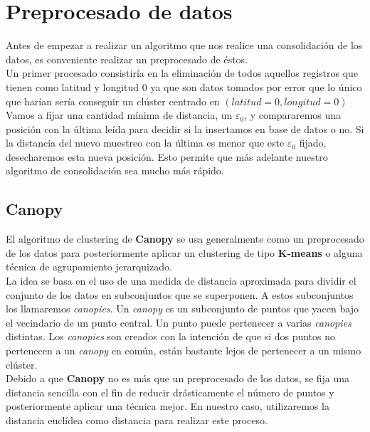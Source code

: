 \documentclass[a4paper, 12pt, spanish]{article}
\begin{document}
\pagebreak
\section{Preprocesado de datos}
Antes de empezar a realizar un algoritmo que nos realice una consolidaci\'on de los datos, es conveniente realizar un preprocesado de \'estos. \\

Un primer procesado consistir\'ia en la eliminaci\'on de todos aquellos registros que tienen como latitud y longitud $0$ ya que son datos tomados por error que lo \'unico que har\'ian ser\'ia conseguir un cl\'uster centrado en $(latitud = 0, longitud = 0)$ \\

Vamos a fijar una cantidad m\'inima de distancia, un $\varepsilon_0$, y compararemos una posici\'on con la \'ultima le\'ida para decidir si la insertamos en base de datos o no. Si la distancia del nuevo muestreo con la \'ultima es menor que este $\varepsilon_0$ fijado, desecharemos esta nueva posici\'on. Esto permite que m\'as adelante nuestro algoritmo de consolidaci\'on sea mucho m\'as r\'apido. \\


\subsection{Canopy}\label{sec:canopy}

El algoritmo de clustering de \textbf{Canopy}\cite{canopy} se usa generalmente como un preprocesado de los datos para posteriormente aplicar un clustering de tipo \textbf{K-means} o alguna t\'ecnica de agrupamiento jerarquizado.\\

La idea se basa en el uso de una medida de distancia aproximada para dividir el conjunto de los datos en subconjuntos que se superponen. A estos subconjuntos los llamaremos \textit{canopies}. Un \textit{canopy} es un subconjunto de puntos que yacen bajo el vecindario de un punto central. Un punto puede pertenecer a varias \textit{canopies} distintas. Los \textit{canopies} son creados con la intenci\'on de que si dos puntos no pertenecen a un \textit{canopy} en com\'un, est\'an bastante lejos de pertenecer a un mismo cl\'uster. \\

Debido a que \textbf{Canopy} no es m\'as que un preprocesado de los datos, se fija una distancia sencilla con el fin de reducir dr\'asticamente el n\'umero de puntos y posteriormente aplicar una t\'ecnica mejor. En nuestro caso, utilizaremos la distancia eucl\'idea como distancia para realizar este proceso. \\
\end{document}
